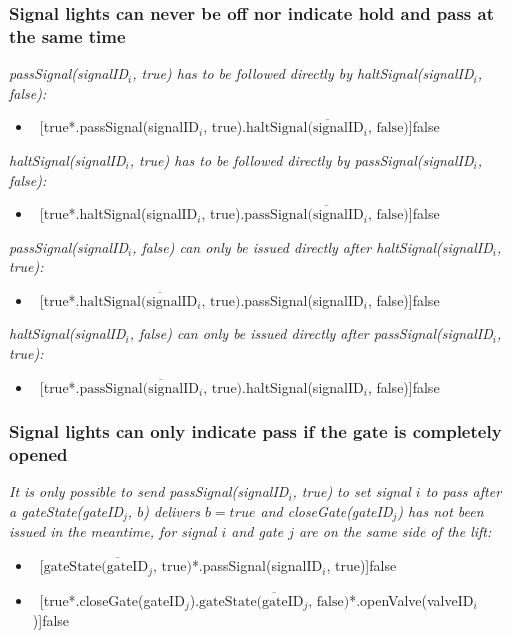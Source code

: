 \subsubsection{Signal lights can never be off nor indicate hold and pass at the same time}
\textit{passSignal(signalID$_i$, true) has to be followed directly by haltSignal(signalID$_i$, false):}
	\begin{itemize}
		\item ~[true*.passSignal(signalID$_i$, true).$\overline{\textrm{haltSignal(signalID$_i$, false)}}$]false
	\end{itemize}
\textit{haltSignal(signalID$_i$, true) has to be followed directly by passSignal(signalID$_i$, false):}
	\begin{itemize}
		\item ~[true*.haltSignal(signalID$_i$, true).$\overline{\textrm{passSignal(signalID$_i$, false)}}$]false
	\end{itemize}
\textit{passSignal(signalID$_i$, false) can only be issued directly after haltSignal(signalID$_i$, true):}
	\begin{itemize}
		\item ~[true*.$\overline{\textrm{haltSignal(signalID$_i$, true)}}$.passSignal(signalID$_i$, false)]false
	\end{itemize}
\textit{haltSignal(signalID$_i$, false) can only be issued directly after passSignal(signalID$_i$, true):}
	\begin{itemize}
		\item ~[true*.$\overline{\textrm{passSignal(signalID$_i$, true)}}$.haltSignal(signalID$_i$, false)]false
	\end{itemize}

\subsubsection{Signal lights can only indicate pass if the gate is completely opened}
\textit{It is only possible to send passSignal(signalID$_i$, true) to set signal $i$ to pass after a gateState(gateID$_j$, $ b $) delivers $b = true$ and closeGate(gateID$_j$) has not been issued in the meantime, for signal $i$ and gate $j$ are on the same side of the lift:}
	\begin{itemize}
		\item ~[$\overline{\textrm{gateState(gateID$_j$, true)}}$*.passSignal(signalID$_i$, true)]false
		\item ~[true*.closeGate(gateID$_j$).$\overline{\textrm{gateState(gateID$_j$, false)}}$*.openValve(valveID$_i$)]false
	\end{itemize}
	
